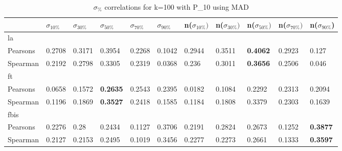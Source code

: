 \documentclass{sig-alternate}
\begin{document}
\begin{table}[h!]
\centering
\begin{tabular}{|l||l|l|l|l|l||l|l|l|l|l|}
\hline
& $\sigma_{10\%}$ & $\sigma_{30\%}$ & $\sigma_{50\%}$ & $\sigma_{70\%}$ & $\sigma_{90\%}$ & n($\sigma_{10\%})$ & n($\sigma_{30\%})$ & n($\sigma_{50\%})$ & n($\sigma_{70\%})$ & n($\sigma_{90\%}$) \\ \hline
\hline la &  &  &  &  &  &  &  &  &  &  \\ \hline
Pearsons & 0.2708 & 0.3171 & 0.3954 & 0.2268 & 0.1042 & 0.2944 & 0.3511 & \textbf{0.4062} & 0.2923 & 0.127 \\ \hline
Spearman & 0.2192 & 0.2798 & 0.3305 & 0.2319 & 0.0368 & 0.236 & 0.3011 & \textbf{0.3656} & 0.2506 & 0.046 \\ \hline
\hline ft &  &  &  &  &  &  &  &  &  &  \\ \hline
Pearsons & 0.0658 & 0.1572 & \textbf{0.2635} & 0.2543 & 0.2395 & 0.0182 & 0.1084 & 0.2292 & 0.2313 & 0.2094 \\ \hline
Spearman & 0.1196 & 0.1869 & \textbf{0.3527} & 0.2418 & 0.1585 & 0.1184 & 0.1808 & 0.3379 & 0.2303 & 0.1639 \\ \hline
\hline fbis &  &  &  &  &  &  &  &  &  &  \\ \hline
Pearsons & 0.2276 & 0.28 & 0.2434 & 0.1127 & 0.3706 & 0.2191 & 0.2824 & 0.2673 & 0.1252 & \textbf{0.3877} \\ \hline
Spearman & 0.2127 & 0.2153 & 0.2495 & 0.1019 & 0.3456 & 0.2277 & 0.2273 & 0.2661 & 0.1333 & \textbf{0.3597} \\ \hline
\end{tabular}
\caption{$\sigma_{\%}$ correlations for k=100 with P\_10 using MAD}
\end{table}
\end{document}
